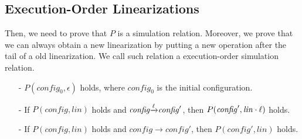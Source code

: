 %
%
%
%
%
%
%

\subsection{Execution-Order Linearizations}
\label{subsec:time order of execution as linearization}

Then, we need to prove that $P$ is a simulation relation. Moreover, we prove that we can always obtain a new linearization by putting a new operation after the tail of a old linearization. We call such relation a execution-order simulation relation.

\begin{itemize}
\setlength{\itemsep}{0.5pt}
\item[-] $P(\mathit{config}_0,\epsilon)$ holds, where $\mathit{config}_0$ is the initial configuration.

\item[-] If $P(\mathit{config},\mathit{lin})$ holds and $\mathit{config} {\xrightarrow{\ell}} \mathit{config}'$, then $P(\mathit{config}', \mathit{lin} \cdot \ell)$ holds.

\item[-] If $P(\mathit{config},\mathit{lin})$ holds and $\mathit{config} {\xrightarrow{}} \mathit{config}'$, then $P(\mathit{config}',\mathit{lin})$ holds.
\end{itemize}

